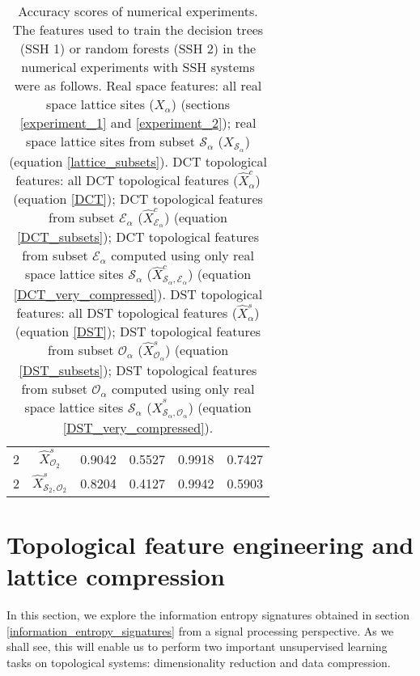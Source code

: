 \documentclass[10pt]{revtex4-1}
\newcommand\xalpha{$X_\alpha$}
\newcommand\xSalpha{$X_{\mathcal{S}_\alpha}$}
\newcommand\xcalpha{$\hat{X}^c_\alpha$}
\newcommand\xcEalpha{$\hat{X}^c_{\mathcal{E}_\alpha}$}
\newcommand\xcSEalpha{$\hat{X}^c_{\mathcal{S}_\alpha,\mathcal{E}_\alpha}$}
\newcommand\xsalpha{$\hat{X}^s_\alpha$}
\newcommand\xsOalpha{$\hat{X}^s_{\mathcal{O}_\alpha}$}
\newcommand\xsSOalpha{$\hat{X}^s_{\mathcal{S}_\alpha,\mathcal{O}_\alpha}$}
\newcommand{\tableRow}[1]{\\[#1 cm]}
\newcommand\tableRowEnd{\tableRow{0.15}}
\newcommand\xsOTwo{$\hat{X}^s_{\mathcal{O}_2}$}
\newcommand\xsOTwoEigVal{0.9042}
\newcommand\xsOTwoEigTest{0.5527}
\newcommand\xsOTwoHamVal{0.9918}
\newcommand\xsOTwoHamTest{0.7427}
\newcommand\xsSOTwo{$\hat{X}^s_{\mathcal{S}_2,\mathcal{O}_2}$}
\newcommand\xsSOTwoEigVal{0.8204}
\newcommand\xsSOTwoEigTest{0.4127}
\newcommand\xsSOTwoHamVal{0.9942}
\newcommand\xsSOTwoHamTest{0.5903}
\begin{document}
\begin{table}
\begin{tabular}{||c@{\hskip 0.3in} c@{\hskip 0.3in} c@{\hskip 0.3in} c@{\hskip 0.3in} c@{\hskip 0.3in} c||}
2                     &\xsOTwo           &\xsOTwoEigVal      &\xsOTwoEigTest     &\xsOTwoHamVal        &\xsOTwoHamTest     \tableRowEnd
2                     &\xsSOTwo          &\xsSOTwoEigVal     &\xsSOTwoEigTest    &\xsSOTwoHamVal       &\xsSOTwoHamTest    \tableRowEnd
\hline
\end{tabular}
\caption{\label{accuracy_scores}Accuracy scores of numerical experiments. The features used to train the decision trees (SSH 1) or random forests (SSH 2) in the numerical experiments with SSH systems were as follows. Real space features: all real space lattice sites (\xalpha) (sections \ref{experiment_1} and \ref{experiment_2}); real space lattice sites from subset $\mathcal{S}_{\alpha}$ (\xSalpha) (equation \eqref{lattice_subsets}). DCT topological features: all DCT topological features (\xcalpha) (equation \eqref{DCT}); DCT topological features from subset $\mathcal{E}_\alpha$ (\xcEalpha) (equation \eqref{DCT_subsets}); DCT topological features from subset $\mathcal{E}_\alpha$ computed using only real space lattice sites $\mathcal{S}_{\alpha}$ (\xcSEalpha) (equation \eqref{DCT_very_compressed}). DST topological features: all DST topological features (\xsalpha) (equation \eqref{DST}); DST topological features from subset $\mathcal{O}_\alpha$ (\xsOalpha) (equation \eqref{DST_subsets}); DST topological features from subset $\mathcal{O}_\alpha$ computed using only real space lattice sites $\mathcal{S}_{\alpha}$ (\xsSOalpha) (equation \eqref{DST_very_compressed}). }
\end{table}




\section{Topological feature engineering and lattice compression}
\label{topological_feature_engineering}

In this section, we explore the information entropy signatures obtained in section \ref{information_entropy_signatures} from a signal processing perspective. As we shall see, this will enable us to perform two important unsupervised learning tasks on topological systems: dimensionality reduction and data compression. 
\end{document}
